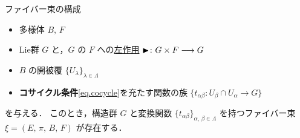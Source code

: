 \documentclass[TQFT_main]{subfiles}
\begin{document}
\begin{myprop}[label=prop.cocycle]{ファイバー束の構成}
	\begin{itemize}
        \item \cinfty 多様体 $B,\, F$
        \item Lie群 $G$ と，$G$ の $F$ への\hyperref[def:Lie-action]{左作用} $\blacktriangleright \colon G \times F \longrightarrow G$
        \item $B$ の開被覆 $\{ U_\lambda \}_{\lambda \in \Lambda}$
        \item \textbf{コサイクル条件}\eqref{eq.cocycle}を充たす\cinfty 関数の族 $\{t_{\alpha\beta} \colon U_\beta \cap U_\alpha \to G\}$
    \end{itemize}
    を与える．
    このとき，構造群 $G$ と変換関数 $\{t_{\alpha\beta}\}_{\alpha,\, \beta \in \Lambda}$ を持つファイバー束 $\xi = (E,\, \pi,\, B,\, F)$ が存在する．
\end{myprop}
\end{document}
